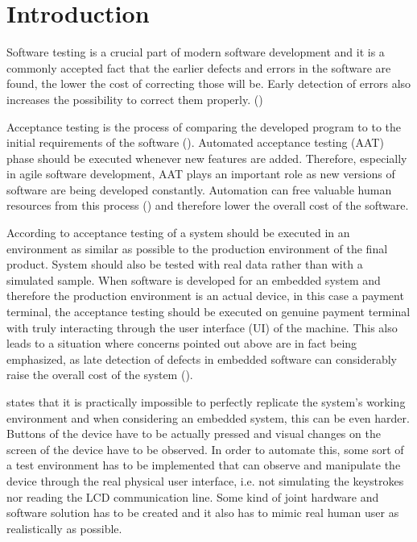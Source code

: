 
\section{Introduction}
\label{section:intro}

Software testing is a crucial part of modern software development and it is a commonly accepted fact that the earlier defects and errors in the software are found, the lower the cost of correcting those will be. Early detection of errors also increases the possibility to correct them properly. (\emph{\cite{myers2011art}})

Acceptance testing is the process of comparing the developed program to to the initial requirements of the software (\emph{\cite{myers2011art}}). Automated acceptance testing (AAT) phase should be executed whenever new features are added. Therefore, especially in agile software development, AAT plays an important role as new versions of software are being developed constantly. Automation can free valuable human resources from this process (\emph{\cite{haugset2008automated}}) and therefore lower the overall cost of the software.

According to \emph{\cite{sommerville2011software}} acceptance testing of a system should be executed in an environment as similar as possible to the production environment of the final product. System should also be tested with real data rather than with a simulated sample. When software is developed for an embedded system and therefore the production environment is an actual device, in this case a payment terminal, the acceptance testing should be executed on genuine payment terminal with truly interacting through the user interface (UI) of the machine. This also leads to a situation where concerns pointed out above are in fact being emphasized, as late detection of defects in embedded software can considerably raise the overall cost of the system (\emph{\cite{ebert2009embedded}}).

\emph{\cite{sommerville2011software}} states that it is practically impossible to perfectly replicate the system's working environment and when considering an embedded system, this can be even harder. Buttons of the device have to be actually pressed and visual changes on the screen of the device have to be observed. In order to automate this, some sort of a test environment has to be implemented that can observe and manipulate the device through the real physical user interface, i.e. not simulating the keystrokes nor reading the LCD communication line. Some kind of joint hardware and software solution has to be created and it also has to mimic real human user as realistically as possible.

